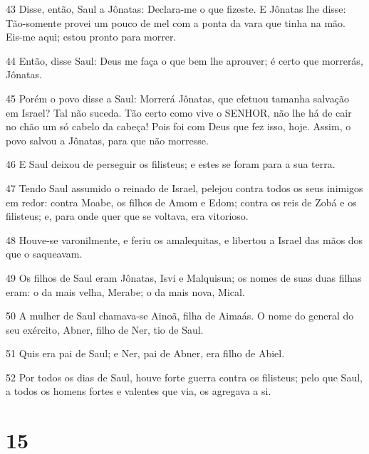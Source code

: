 \par 43 Disse, então, Saul a Jônatas: Declara-me o que fizeste. E Jônatas lhe disse: Tão-somente provei um pouco de mel com a ponta da vara que tinha na mão. Eis-me aqui; estou pronto para morrer.
\par 44 Então, disse Saul: Deus me faça o que bem lhe aprouver; é certo que morrerás, Jônatas.
\par 45 Porém o povo disse a Saul: Morrerá Jônatas, que efetuou tamanha salvação em Israel? Tal não suceda. Tão certo como vive o SENHOR, não lhe há de cair no chão um só cabelo da cabeça! Pois foi com Deus que fez isso, hoje. Assim, o povo salvou a Jônatas, para que não morresse.
\par 46 E Saul deixou de perseguir os filisteus; e estes se foram para a sua terra.
\par 47 Tendo Saul assumido o reinado de Israel, pelejou contra todos os seus inimigos em redor: contra Moabe, os filhos de Amom e Edom; contra os reis de Zobá e os filisteus; e, para onde quer que se voltava, era vitorioso.
\par 48 Houve-se varonilmente, e feriu os amalequitas, e libertou a Israel das mãos dos que o saqueavam.
\par 49 Os filhos de Saul eram Jônatas, Isvi e Malquisua; os nomes de suas duas filhas eram: o da mais velha, Merabe; o da mais nova, Mical.
\par 50 A mulher de Saul chamava-se Ainoã, filha de Aimaás. O nome do general do seu exército, Abner, filho de Ner, tio de Saul.
\par 51 Quis era pai de Saul; e Ner, pai de Abner, era filho de Abiel.
\par 52 Por todos os dias de Saul, houve forte guerra contra os filisteus; pelo que Saul, a todos os homens fortes e valentes que via, os agregava a si.

\chapter{15}

